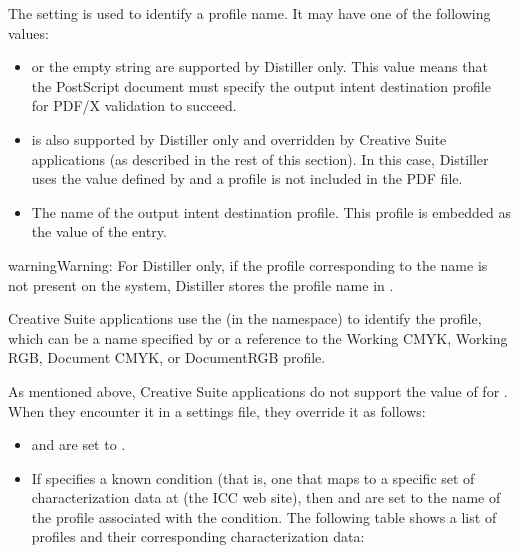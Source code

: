 \documentclass[letterpaper,12pt,english,openany,oneside]{sphinxmanual}
\begin{document}
The  setting is used to identify a profile name. It may have one of the following values:
\begin{itemize}
\item {} 
 or the empty string \sphinxcode{\sphinxupquote{()}} are supported by Distiller only. This value means that the PostScript document must specify the output intent destination profile for PDF/X validation to succeed.

\item {} 
 is also supported by Distiller only and overridden by Creative Suite applications (as described in the rest of this section). In this case, Distiller uses the value defined by  and a profile is not included in the PDF file.

\item {} 
The name of the output intent destination profile. This profile is embedded as the value of the  entry.

\end{itemize}

\begin{sphinxadmonition}{warning}{Warning:}
For Distiller only, if the profile corresponding to the name is not present on the system, Distiller stores the profile name in  .
\end{sphinxadmonition}

Creative Suite applications use the  (in the  namespace) to identify the profile, which can be a name specified by  or a reference to the Working CMYK, Working RGB, Document CMYK, or DocumentRGB profile.

As mentioned above, Creative Suite applications do not support the value of  for  . When they encounter it in a settings file, they override it as follows:
\begin{itemize}
\item {} 
 and  are set to  .

\item {} 
If  specifies a known condition (that is, one that maps to a specific set of characterization data at  (the ICC web site), then  and  are set to the name of the profile associated with the condition. The following table shows a list of profiles and their corresponding characterization data:

\end{itemize}
\end{document}
